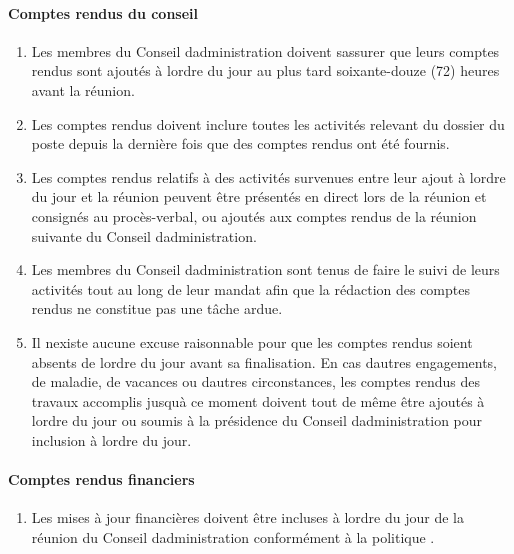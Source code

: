 \paragraph{Comptes rendus du conseil}
\begin{enumerate}
 \item
  Les membres du Conseil d\textquotesingle administration doivent s\textquotesingle assurer que leurs comptes rendus sont ajoutés à l\textquotesingle ordre du jour au plus tard soixante-douze (72) heures avant la réunion.
 \item
  Les comptes rendus doivent inclure toutes les activités relevant du dossier du poste depuis la dernière fois que des comptes rendus ont été fournis.
 \item
  Les comptes rendus relatifs à des activités survenues entre leur ajout à l\textquotesingle ordre du jour et la réunion peuvent être présentés en direct lors de la réunion et consignés au procès-verbal, ou ajoutés aux comptes rendus de la réunion suivante du Conseil d\textquotesingle administration.
 \item
  Les membres du Conseil d\textquotesingle administration sont tenus de faire le suivi de leurs activités tout au long de leur mandat afin que la rédaction des comptes rendus ne constitue pas une tâche ardue.
 \item
  Il n\textquotesingle existe aucune excuse raisonnable pour que les comptes rendus soient absents de l\textquotesingle ordre du jour avant sa finalisation. En cas d\textquotesingle autres engagements, de maladie, de vacances ou d\textquotesingle autres circonstances, les comptes rendus des travaux accomplis jusqu\textquotesingle à ce moment doivent tout de même être ajoutés à l\textquotesingle ordre du jour ou soumis à la présidence du Conseil d\textquotesingle administration pour inclusion à l\textquotesingle ordre du jour.
\end{enumerate}

\paragraph{Comptes rendus financiers}
\begin{enumerate}
 \item
  Les mises à jour financières doivent être incluses à l\textquotesingle ordre du jour de la réunion du Conseil d\textquotesingle administration conformément à la politique .
\end{enumerate}

